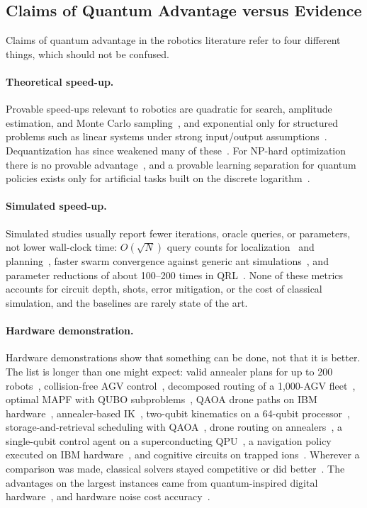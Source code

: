 \documentclass[acmsmall,screen,review]{acmart}
\begin{document}
\subsection{Claims of Quantum Advantage versus Evidence}\label{sec:claims}
Claims of quantum advantage in the robotics literature refer to four different things, which should not be confused.

\paragraph{Theoretical speed-up.} Provable speed-ups relevant to robotics are quadratic for search, amplitude estimation, and Monte Carlo sampling~\cite{Grover1996,Brassard2002,Montanaro2015}, and exponential only for structured problems such as linear systems under strong input/output assumptions~\cite{Harrow2009,Aaronson2015}. Dequantization has since weakened many of these~\cite{Tang2019,Chia2020}. For NP-hard optimization there is no provable advantage~\cite{Farhi2014}, and a provable learning separation for quantum policies exists only for artificial tasks built on the discrete logarithm~\cite{Jerbi2021}.

\paragraph{Simulated speed-up.} Simulated studies usually report fewer iterations, oracle queries, or parameters, not lower wall-clock time: $O(\sqrt{N})$ query counts for localization~\cite{Antero2025} and planning~\cite{Chella2022}, faster swarm convergence against generic ant simulations~\cite{Chella2023}, and parameter reductions of about 100--200 times in QRL~\cite{Acuto2022,Dragan2025}. None of these metrics accounts for circuit depth, shots, error mitigation, or the cost of classical simulation, and the baselines are rarely state of the art.

\paragraph{Hardware demonstration.} Hardware demonstrations show that something can be done, not that it is better. The list is longer than one might expect: valid annealer plans for up to 200 robots~\cite{Clark2019}, collision-free AGV control~\cite{Ohzeki2019}, decomposed routing of a 1,000-AGV fleet~\cite{Quang2025}, optimal MAPF with QUBO subproblems~\cite{Gerlach2025}, QAOA drone paths on IBM hardware~\cite{Innan2025}, annealer-based IK~\cite{Salloum2026}, two-qubit kinematics on a 64-qubit processor~\cite{Otani2025}, storage-and-retrieval scheduling with QAOA~\cite{Windmann2023}, drone routing on annealers~\cite{OsabaDrone2025}, a single-qubit control agent on a superconducting QPU~\cite{Ngo2026}, a navigation policy executed on IBM hardware~\cite{Altrabulsi2026}, and cognitive circuits on trapped ions~\cite{Widdows2023}. Wherever a comparison was made, classical solvers stayed competitive or did better~\cite{Ohzeki2019,Smierzchalski2024,Leib2023,Willmann2025}. The advantages on the largest instances came from quantum-inspired digital hardware~\cite{Leib2023}, and hardware noise cost accuracy~\cite{Antero2025}.
\end{document}
